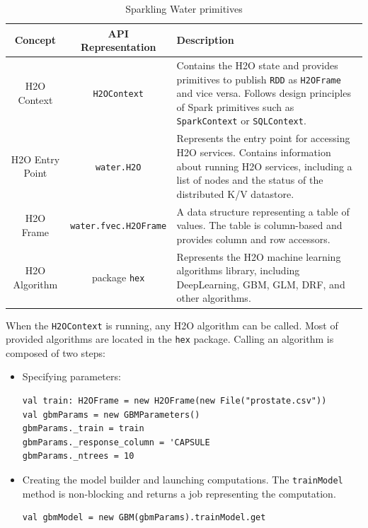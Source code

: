 \documentclass{standalone}
\begin{document}
\begin{table}[!ht]
\centering
\begin{tabular}{c c p{5.2cm}}
\toprule
Concept & API Representation & Description \\
\midrule
H2O Context & \texttt{H2OContext} & Contains the
H2O state and provides primitives to publish \texttt{RDD} as \texttt{H2OFrame} and
vice versa. Follows design principles of Spark primitives such as
\texttt{SparkContext} or \texttt{SQLContext}. \\ \addlinespace

H2O Entry Point & \texttt{water.H2O} & Represents the entry point for accessing
H2O services. Contains information about running H2O services, including a list of
nodes and the status of the distributed K/V datastore. \\  \addlinespace

H2O Frame &  \small{\texttt{water.fvec.H2OFrame}} & A data structure 
representing a table of values. The table is column-based and provides column and
row accessors. \\  \addlinespace

H2O Algorithm & package \texttt{hex} & Represents the H2O machine learning
algorithms library, including DeepLearning, GBM, GLM, DRF, and other
algorithms. \\

\bottomrule
\end{tabular} 
\caption{Sparkling Water primitives}
\label{tab:primitives}
\end{table}

\pagebreak
When the \texttt{H2OContext} is running, any H2O algorithm can be called. Most of provided algorithms are located in the \texttt{hex} package. Calling an algorithm is composed of two steps:

\begin{itemize}
	\item Specifying parameters:
\begin{lstlisting}[style=Scala]
val train: H2OFrame = new H2OFrame(new File("prostate.csv"))
val gbmParams = new GBMParameters()
gbmParams._train = train
gbmParams._response_column = 'CAPSULE
gbmParams._ntrees = 10
\end{lstlisting}

	\item Creating the model builder and launching computations. The \texttt{trainModel} method is non-blocking and returns a job representing the computation.
\begin{lstlisting}[style=Scala]
val gbmModel = new GBM(gbmParams).trainModel.get
\end{lstlisting}
\end{itemize}
\end{document}
